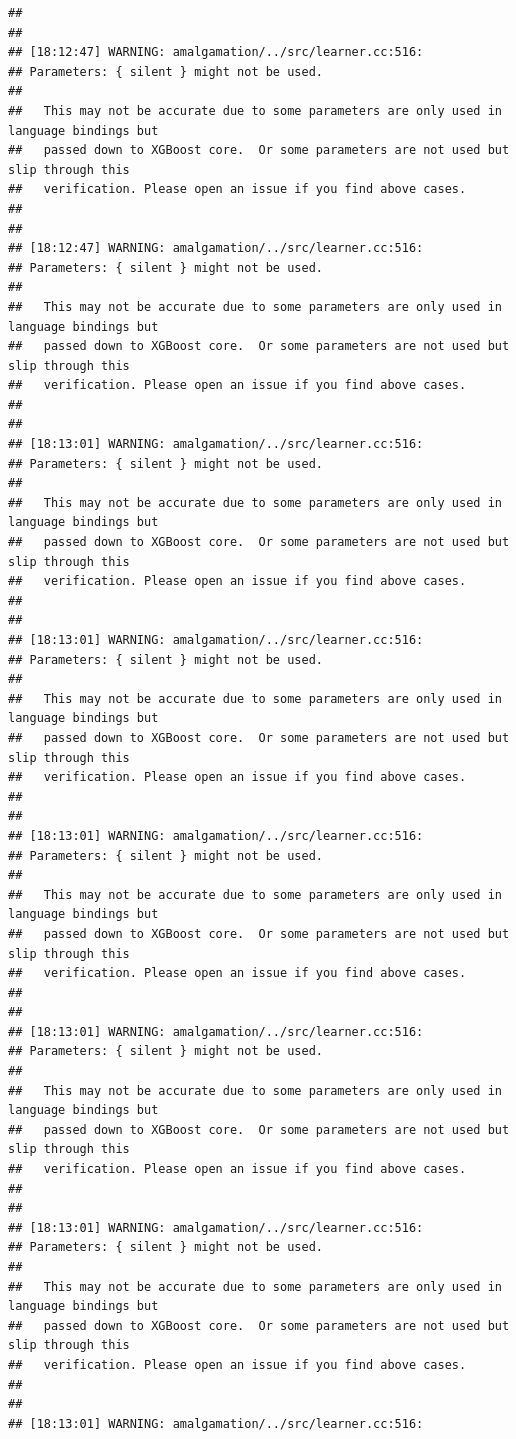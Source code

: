 \documentclass[AMS,STIX2COL]{WileyNJD-v2}\usepackage[]{graphicx}\usepackage[]{color}
\makeatletter
\newenvironment{kframe}{%
 \def\at@end@of@kframe{}%
 \ifinner\ifhmode%
  \def\at@end@of@kframe{\end{minipage}}%
  \begin{minipage}{\columnwidth}%
 \fi\fi%
 \def\FrameCommand##1{\hskip\@totalleftmargin \hskip-\fboxsep
 \colorbox{shadecolor}{##1}\hskip-\fboxsep
     \hskip-\linewidth \hskip-\@totalleftmargin \hskip\columnwidth}%
 \MakeFramed {\advance\hsize-\width
   \@totalleftmargin\z@ \linewidth\hsize
   \@setminipage}}%
 {\par\unskip\endMakeFramed%
 \at@end@of@kframe}
\newenvironment{knitrout}{}{} %
\makeatother
\begin{document}
\begin{knitrout}
\begin{kframe}
\begin{verbatim}
## 
## 
## [18:12:47] WARNING: amalgamation/../src/learner.cc:516: 
## Parameters: { silent } might not be used.
## 
##   This may not be accurate due to some parameters are only used in language bindings but
##   passed down to XGBoost core.  Or some parameters are not used but slip through this
##   verification. Please open an issue if you find above cases.
## 
## 
## [18:12:47] WARNING: amalgamation/../src/learner.cc:516: 
## Parameters: { silent } might not be used.
## 
##   This may not be accurate due to some parameters are only used in language bindings but
##   passed down to XGBoost core.  Or some parameters are not used but slip through this
##   verification. Please open an issue if you find above cases.
## 
## 
## [18:13:01] WARNING: amalgamation/../src/learner.cc:516: 
## Parameters: { silent } might not be used.
## 
##   This may not be accurate due to some parameters are only used in language bindings but
##   passed down to XGBoost core.  Or some parameters are not used but slip through this
##   verification. Please open an issue if you find above cases.
## 
## 
## [18:13:01] WARNING: amalgamation/../src/learner.cc:516: 
## Parameters: { silent } might not be used.
## 
##   This may not be accurate due to some parameters are only used in language bindings but
##   passed down to XGBoost core.  Or some parameters are not used but slip through this
##   verification. Please open an issue if you find above cases.
## 
## 
## [18:13:01] WARNING: amalgamation/../src/learner.cc:516: 
## Parameters: { silent } might not be used.
## 
##   This may not be accurate due to some parameters are only used in language bindings but
##   passed down to XGBoost core.  Or some parameters are not used but slip through this
##   verification. Please open an issue if you find above cases.
## 
## 
## [18:13:01] WARNING: amalgamation/../src/learner.cc:516: 
## Parameters: { silent } might not be used.
## 
##   This may not be accurate due to some parameters are only used in language bindings but
##   passed down to XGBoost core.  Or some parameters are not used but slip through this
##   verification. Please open an issue if you find above cases.
## 
## 
## [18:13:01] WARNING: amalgamation/../src/learner.cc:516: 
## Parameters: { silent } might not be used.
## 
##   This may not be accurate due to some parameters are only used in language bindings but
##   passed down to XGBoost core.  Or some parameters are not used but slip through this
##   verification. Please open an issue if you find above cases.
## 
## 
## [18:13:01] WARNING: amalgamation/../src/learner.cc:516: 

\end{verbatim}
\end{kframe}
\end{knitrout}
\end{document}
